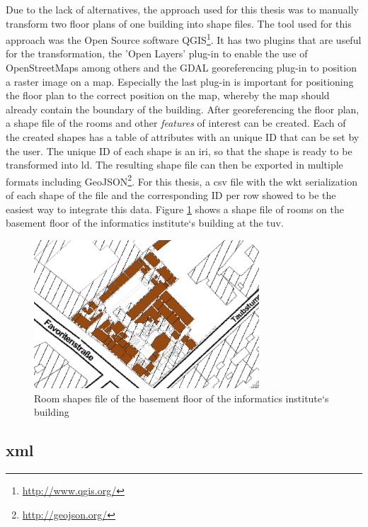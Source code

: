 \documentclass[draft,final]{vutinfth} %
\begin{document}
Due to the lack of alternatives, the approach used for this thesis was to manually transform two floor plans of one building into shape files. The tool used for this approach was the Open Source software QGIS\footnote{\url{http://www.qgis.org/}}. It has two plugins that are useful for the transformation, the 'Open Layers' plug-in to enable the use of OpenStreetMaps among others and the GDAL georeferencing plug-in to position a raster image on a map. Especially the last plug-in is important for positioning the floor plan to the correct position on the map, whereby the map should already contain the boundary of the building. After georeferencing the floor plan, a shape file of the rooms and other \textit{features} of interest can be created. Each of the created shapes has a table of attributes with an unique ID that can be set by the user. The unique ID of each shape is an \gls{iri}, so that the shape is ready to be transformed into \gls{ld}. The resulting shape file can then be exported in multiple formats including GeoJSON\footnote{\url{http://geojson.org/}}. For this thesis, a \gls{csv} file with the \gls{wkt} serialization of each shape of the file and the corresponding ID per row showed to be the easiest way to integrate this data. Figure \ref{fig:solution-data-acquisition:tuvienna-lib-gm-indoor} shows a shape file of rooms on the basement floor of the informatics institute`s building at the \gls{tuv}.

\begin{figure}[h]
    \centering
    \includegraphics[width=0.75\textwidth]{graphics/qgis-floor-plan-building-h-eg.png}
    \caption{Room shapes file of the basement floor of the informatics institute`s building}
    \label{fig:solution-data-acquisition:tuvienna-lib-gm-indoor}
\end{figure}

\subsection{\gls{xml}}
\label{solution-data-acquisition-tables}
\end{document}
